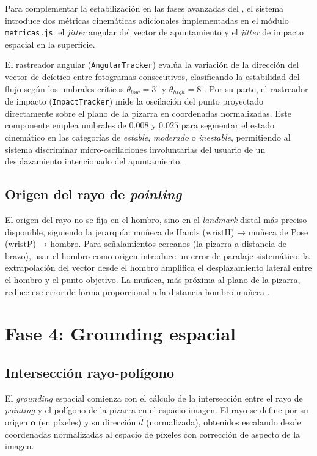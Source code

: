 \documentclass[12pt]{report} %
\begin{document}
Para complementar la estabilización en las fases avanzadas del , el sistema introduce dos métricas cinemáticas adicionales implementadas en el módulo \texttt{metricas.js}: el \textit{jitter} angular del vector de apuntamiento y el \textit{jitter} de impacto espacial en la superficie. 

El rastreador angular (\texttt{AngularTracker}) evalúa la variación de la dirección del vector de deíctico entre fotogramas consecutivos, clasificando la estabilidad del flujo según los umbrales críticos $\theta_{low} = 3^\circ$ y $\theta_{high} = 8^\circ$. Por su parte, el rastreador de impacto (\texttt{ImpactTracker}) mide la oscilación del punto proyectado directamente sobre el plano de la pizarra en coordenadas normalizadas. Este componente emplea umbrales de $0.008$ y $0.025$ para segmentar el estado cinemático en las categorías de \textit{estable}, \textit{moderado} o \textit{inestable}, permitiendo al sistema discriminar micro-oscilaciones involuntarias del usuario de un desplazamiento intencionado del apuntamiento.

\subsection{Origen del rayo de \textit{pointing}}

El origen del rayo no se fija en el hombro, sino en el \textit{landmark} distal más preciso disponible, siguiendo la jerarquía: muñeca de Hands ($\text{wristH}$) → muñeca de Pose ($\text{wristP}$) → hombro. Para señalamientos cercanos (la pizarra a distancia de brazo), usar el hombro como origen introduce un error de paralaje sistemático: la extrapolación del vector desde el hombro amplifica el desplazamiento lateral entre el hombro y el punto objetivo. La muñeca, más próxima al plano de la pizarra, reduce ese error de forma proporcional a la distancia hombro-muñeca \citep{arslanoglu2025pointing3d}.

\section{Fase 4: Grounding espacial}

\subsection{Intersección rayo-polígono}

El \textit{grounding} espacial comienza con el cálculo de la intersección entre el rayo de \textit{pointing} y el polígono de la pizarra en el espacio imagen. El rayo se define por su origen $\mathbf{o}$ (en píxeles) y su dirección $\hat{d}$ (normalizada), obtenidos escalando desde coordenadas normalizadas al espacio de píxeles con corrección de aspecto de la imagen.
\end{document}
